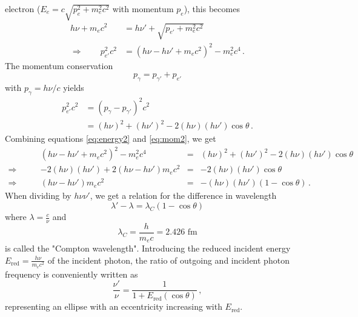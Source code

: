 electron ($E_e = c\sqrt{p_e^2 + m_e^2c^2}$ with momentum $p_e$), this becomes 
\begin{align}
    h\nu + m_ec^2 &= h\nu' + \sqrt{p_{e'} + m_e^2c^2} \\
    \Rightarrow \qquad p_{e'}^2c^2 &= \left(h\nu - h\nu' + m_ec^2\right)^2 - m_e^2c^4 \, .
    \label{eq:energy2}
\end{align}
The momentum conservation 
\begin{equation}
    p_\gamma = p_{\gamma'} + p_{e'}	
    \label{eq:momentum_conservation}
\end{equation}
with $p_\gamma = h\nu/c$ yields
\begin{equation}
    \begin{split}
        p_{e'}^2c^2  &= \left(p_\gamma - p_{\gamma'}\right)^2c^2 \\
                     &= (h\nu)^2 + (h\nu')^2 - 2(h\nu)(h\nu')\cos\theta \, .
        \label{eq:mom2}
    \end{split}
\end{equation}
Combining equations \eqref{eq:energy2} and \eqref{eq:mom2}, we get
\begin{align}
    &(h\nu - h\nu' + m_ec^2)^2 - m_e^2c^4 	&=& (h\nu)^2 + (h\nu')^2 - 2(h\nu)(h\nu')\cos\theta \\
    \Rightarrow \qquad &-2(h\nu)(h\nu') + 2(h\nu - h\nu')m_ec^2 &=& -2(h\nu)(h\nu')\cos\theta \\
    \Rightarrow \qquad &(h\nu - h\nu')m_ec^2 &=& -(h\nu)(h\nu')(1 - \cos\theta) \, .
    \label{eq:en_mom}
\end{align}
When dividing by $h\nu\nu'$, we get a relation for the difference in wavelength 
\begin{equation}
    \lambda' - \lambda = \lambda_C(1 - \cos\theta)	
    \label{eq:compton1}
\end{equation}
where $\lambda = \frac{c}{\nu}$ and 
\begin{equation}
    \lambda_C = \frac{h}{m_ec} = 2.426 \text{ fm} 
    \label{eq:compton_wavelength}
\end{equation}
is called the "Compton wavelength". 
Introducing the reduced incident energy $E_\text{red} = \frac{h\nu}{m_ec^2}$ of the incident photon, the ratio of outgoing 
and incident photon frequency is conveniently written as 
\begin{equation}
    \frac{\nu'}{\nu} = \frac{1}{1 + E_\text{red}(\cos\theta)}	\, ,
    \label{eq:freq_rati}
\end{equation}
representing an ellipse with an eccentricity increasing with $E_\text{red}$.\cite{siegbahn2012alpha} 
